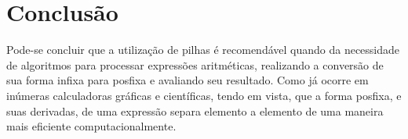\documentclass[a4paper,11pt]{article}
\begin{document}
\section{Conclusão}
Pode-se concluir que a utilização de pilhas é recomendável quando da necessidade de algoritmos para processar expressões aritméticas, realizando a conversão de sua forma infixa para posfixa e avaliando seu resultado. Como já ocorre em inúmeras calculadoras gráficas e científicas, tendo em vista, que a forma posfixa, e suas derivadas, de uma expressão separa elemento a elemento de uma maneira mais eficiente computacionalmente.

\nocite{*}					%
		
		
\end{document}

